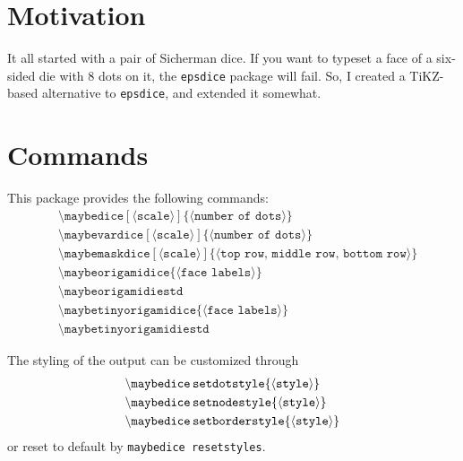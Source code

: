 \documentclass[11pt]{article}
\newcommand{\command}[1]{\text{\textbackslash}\texttt{#1}}
\newcommand{\param}[1]{\{\text{$\langle$}\texttt{#1}\text{$\rangle$}\}}
\newcommand{\optparam}[1]{[\text{$\langle$}\texttt{#1}\text{$\rangle$}]}
\begin{document}
\section{Motivation}
It all started with a pair of Sicherman dice.
If you want to typeset a face of a six-sided die with 8 dots on it, the \texttt{epsdice} package will fail.
So, I created a TiKZ-based alternative to \texttt{epsdice}, and extended it somewhat.


\section{Commands}
This package provides the following commands:
\begin{align*}
    &\command{maybedice}\optparam{scale}\param{number of dots} \\
    &\command{maybevardice}\optparam{scale}\param{number of dots} \\
    &\command{maybemaskdice}\optparam{scale}\param{top row, middle row, bottom row} \\
    &\command{maybeorigamidice}\param{face labels} \\
    &\command{maybeorigamidiestd} \\
    &\command{maybetinyorigamidice}\param{face labels} \\
    &\command{maybetinyorigamidiestd}
\end{align*}

The styling of the output can be customized through
\begin{align*}
    &\command{maybedice\,setdotstyle}\param{style} \\
    &\command{maybedice\,setnodestyle}\param{style} \\
    &\command{maybedice\,setborderstyle}\param{style}
\end{align*}
or reset to default by \command{maybedice\,resetstyles}.

\end{document}
